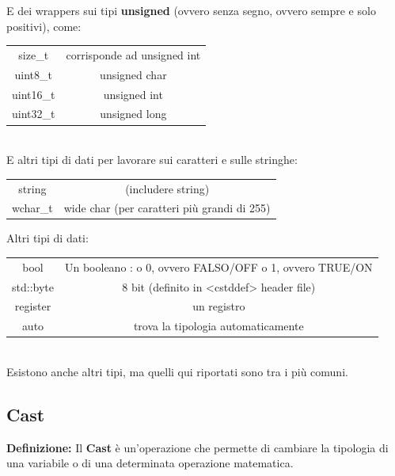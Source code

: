 \textsf{\small E dei wrappers sui tipi \textbf{unsigned} (ovvero senza segno, ovvero sempre e solo positivi), come: }\\

\begin{tabular}{cc}
	\color{myblue2}size\_t & corrisponde ad unsigned int \\
	\color{myblue2}uint8\_t & unsigned char \\
	\color{myblue2}uint16\_t & unsigned int  \\
	\color{myblue2}uint32\_t & unsigned long \\ 
\end{tabular} \\

\textsf{\small E altri tipi di dati per lavorare sui caratteri e sulle stringhe: }\\

\begin{tabular}{cc}
	\color{myblue2}string & (includere string) \\
	\color{myblue2}wchar\_t & wide char (per caratteri più grandi di 255) \\
\end{tabular}

\break

\textsf{\small Altri tipi di dati: } \\

\begin{tabular}{cc} %
	\color{myblue2}bool & Un booleano : o 0, ovvero FALSO/OFF o 1, ovvero TRUE/ON \\
	\color{myblue2}std::byte & 8 bit (definito in <cstddef> header file) \\
	\color{myblue2}register &  un registro\\ 
	\color{myblue2} auto &  trova la tipologia automaticamente\\
\end{tabular}\\

\textsf{\small Esistono anche altri tipi, ma quelli qui riportati sono tra i più comuni.}\\

\subsection{Cast}

\textsf{\small \textbf{Definizione: } Il \textbf{Cast} è un'operazione che permette di cambiare la tipologia di una variabile o di una determinata operazione matematica.} 

